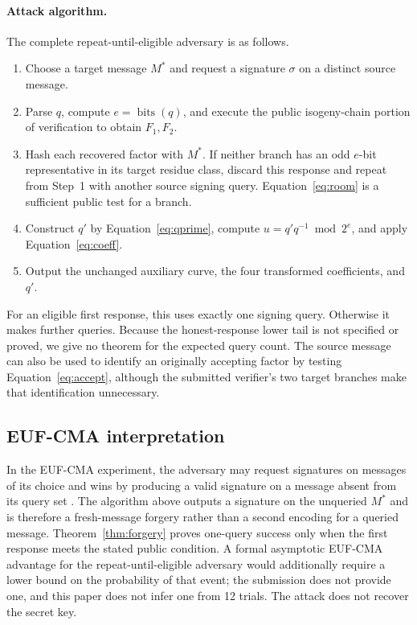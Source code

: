 \documentclass[11pt,a4paper]{article}
\newcommand{\bits}{\operatorname{bits}}
\begin{document}
\paragraph{Attack algorithm.}
The complete repeat-until-eligible adversary is as follows.
\begin{enumerate}[leftmargin=2em]
  \item Choose a target message $M^*$ and request a signature $\sigma$ on a
        distinct source message.
  \item Parse $q$, compute $e=\bits(q)$, and execute the public
        isogeny-chain portion of verification to obtain $F_1,F_2$.
  \item Hash each recovered factor with $M^*$. If neither branch has an odd
        $e$-bit representative in its target residue class, discard this
        response and repeat from Step~1 with another source signing query.
        Equation~\eqref{eq:room} is a sufficient public test for a branch.
  \item Construct $q'$ by Equation~\eqref{eq:qprime}, compute
        $u=q'q^{-1}\bmod 2^e$, and apply Equation~\eqref{eq:coeff}.
  \item Output the unchanged auxiliary curve, the four transformed
        coefficients, and $q'$.
\end{enumerate}
For an eligible first response, this uses exactly one signing query. Otherwise
it makes further queries. Because the honest-response lower tail is not
specified or proved, we give no theorem for the expected query count. The
source message can also be used to identify an originally accepting factor by
testing Equation~\eqref{eq:accept}, although the submitted verifier's two
target branches make that identification unnecessary.

\subsection{EUF-CMA interpretation}

In the EUF-CMA experiment, the adversary may request signatures on messages of
its choice and wins by producing a valid signature on a message absent from
its query set \cite{gmr}. The algorithm above outputs a signature on the
unqueried $M^*$ and is therefore a fresh-message forgery rather than a second
encoding for a queried message. Theorem~\ref{thm:forgery} proves one-query
success only when the first response meets the stated public condition. A
formal asymptotic EUF-CMA advantage for the repeat-until-eligible adversary
would additionally require a lower bound on the probability of that event;
the submission does not provide one, and this paper does not infer one from
12 trials. The attack does not recover the secret key.
\end{document}
